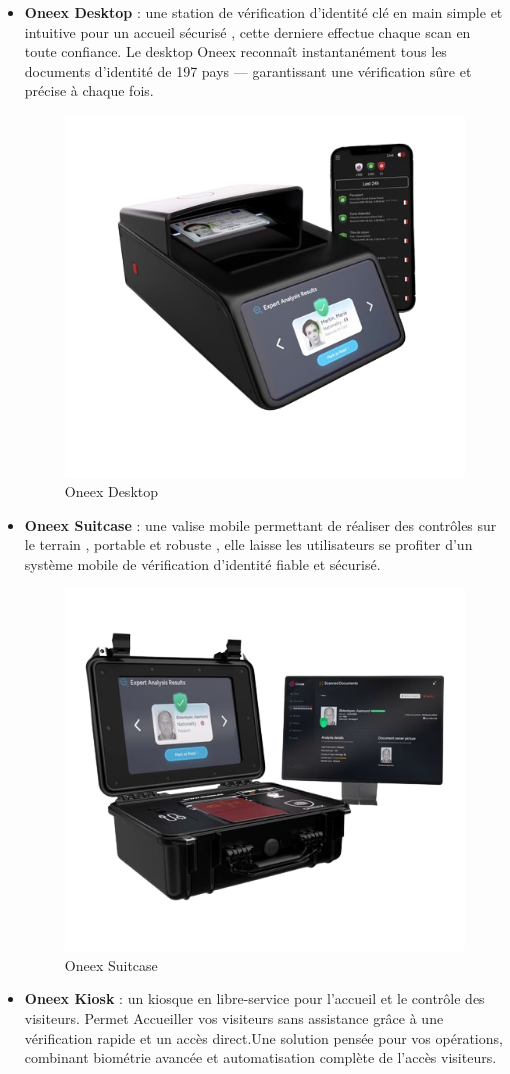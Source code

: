 \begin{itemize}
	\item \textbf{Oneex Desktop} : une station de vérification d’identité clé en main simple et intuitive pour un accueil sécurisé , cette derniere effectue chaque scan en toute confiance. Le desktop Oneex reconnaît instantanément tous les documents d'identité de 197 pays — garantissant une vérification sûre et précise à chaque fois.
	      \begin{figure} [H]
		      \centering
		      \includegraphics[width=.5\textwidth]{figures/Oneex desktop.png}
		      \caption{Oneex Desktop}
		      \label{fig:Oneex desktop}
	      \end{figure}
	\item \textbf{Oneex Suitcase} : une valise mobile permettant de réaliser des contrôles sur le terrain , portable et robuste , elle laisse les utilisateurs se profiter d’un système mobile de vérification d’identité fiable et sécurisé.
	      \begin{figure} [H]
		      \centering
		      \includegraphics[width=.5\textwidth]{figures/Oneex suitcase.png}
		      \caption{Oneex Suitcase}
		      \label{fig:Oneex Suitcase}
	      \end{figure}
	\item \textbf{Oneex Kiosk} : un kiosque en libre-service pour l’accueil et le contrôle des visiteurs. Permet Accueiller vos visiteurs sans assistance grâce à une vérification rapide et un accès direct.Une solution pensée pour vos opérations, combinant biométrie avancée et automatisation complète de l’accès visiteurs.

\end{itemize}
